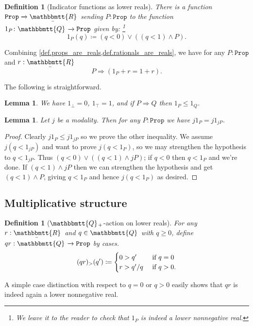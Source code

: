 \documentclass[reqno,11pt]{amsproc}
\theoremstyle{plain}
\newtheorem{lemma}[theorem]{Lemma}
\newtheorem{definition}[theorem]{Definition}
\theoremstyle{definition}
\newcommand{\Const}[1]{\mathtt{#1}}
\renewcommand{\to}[1][]{\xrightarrow{#1}}
\newcommand{\tn}[1]{\textnormal{#1}}
\newcommand{\ubar}[1]{\underaccent{\bar}{#1}}
\newcommand{\ind}[1]{1_{#1}}			%
\newcommand{\internal}[1]{\raisebox{-.03ex}{$\mathbbmtt{#1}$}}
\newcommand{\hs}{\hspace{1pt}}
\newcommand{\tqq}{\internal{Q}\hs}
\newcommand{\trr}{\internal{R}}
\newcommand{\tlrr}{\ubar{\trr}\hs}
\newcommand{\prop}{\Const{Prop}}
\newcommand{\imp}{\Rightarrow}
\numberwithin{equation}{section}
\begin{document}
\begin{definition}[Indicator functions as lower reals]\label{def.props_are_reals}
There is a function $\prop\to\tlrr$ sending $P:\prop$ to the function $\ind{P}\colon\tqq\to\prop$ given by:%
\footnote{We leave it to the reader to check that $\ind{P}$ is indeed a lower nonnegative real.}
\[\ind{P}(q)\coloneqq(q<0)\vee ((q<1)\wedge P).\]
\end{definition}

Combining \cref{def.props_are_reals,def.rationals_are_reals}, we have for any $P:\prop$ and $r:\tlrr$
\begin{equation}\label{eqn.indicator}
P\imp (\ind{P}+r=1+r).
\end{equation}

The following is straightforward.
\begin{lemma}\label{lemma.ind_monotonic}
We have $\ind{\bot}=0$, $\ind{\top}=1$, and if $P\imp Q$ then $\ind{P}\leq\ind{Q}$.
\end{lemma}

\begin{lemma}\label{lemma.j_indicator}
Let $j$ be a modality. Then for any $P:\prop$ we have $j\ind{P}=j\ind{jP}$.
\end{lemma}
\begin{proof}
Clearly $j\ind{P}\leq j\ind{jP}$ so we prove the other inequality. We assume $j(q<\ind{jP})$ and want to prove $j(q<\ind{P})$, so we may strengthen the hypothesis to $q<\ind{jP}$. Thus $(q<0)\vee((q<1)\wedge jP)$; if $q<0$ then $q<\ind{P}$ and we're done. If $(q<1)\wedge jP$ then we can strengthen the hypothesis and get $(q<1)\wedge P$, giving $q<\ind{P}$ and hence $j(q<\ind{P})$ as desired.
\end{proof}

\subsection{Multiplicative structure}

\begin{definition}[$\tqq_+$-action on lower reals]\label{def.Q_action}
For any $r:\tlrr$ and $q\in\tqq$ with $q\geq 0$, define $q r:\tqq\to\prop$ by cases.
\[
(q r)_>(q')\coloneqq
\begin{cases}
	0>q'&\tn{ if }q=0\\
	r>q'/q&\tn{ if }q>0.
\end{cases}
\]
\end{definition}

A simple case distinction with respect to $q = 0$ or $q > 0$ easily shows that $q r$ is indeed again a lower nonnegative real.
\end{document}
